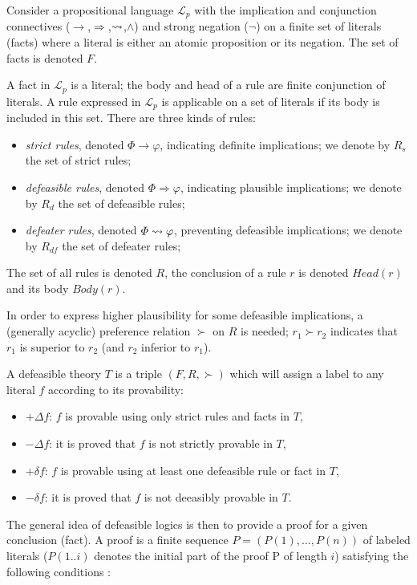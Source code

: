 \documentclass[version=3.21, pagesize, twoside=off, bibliography=totoc, DIV=calc, fontsize=12pt, a4paper, french, english]{scrartcl}
\begin{document}
Consider a propositional language $\mathcal{L}_p$ with the implication and conjunction connectives ($\rightarrow$,$\Rightarrow$,$\mathrel{\leadsto}$,$\land$) and strong negation ($\lnot$) on a finite set of literals (facts) where a literal is either an atomic proposition or its negation. 
The set of facts is denoted $F$.

A fact in $\mathcal{L}_p$ is a literal; the body and head of a rule are finite conjunction of literals. A rule expressed in $\mathcal{L}_p$ is applicable on a set of literals if its body is included in this set.
There are three kinds of rules:
\begin{itemize}
\item \emph{strict rules}, denoted $\Phi \rightarrow \varphi$, indicating definite implications; we denote by $R_s$ the set of strict rules;
\item \emph{defeasible rules}, denoted $\Phi \Rightarrow \varphi$, indicating plausible implications; we denote by $R_d$ the set of defeasible rules;
\item \emph{defeater rules}, denoted $\Phi \mathrel{\leadsto} \varphi$, preventing defeasible implications; we denote by $R_{df}$ the set of defeater rules;
\end{itemize}
The set of all rules is denoted $R$, the conclusion of a rule $r$ is denoted $Head(r)$ and its body $Body(r)$.

In order to express higher plausibility for some defeasible implications, a (generally acyclic) preference relation $\succ$ on $R$ is needed; $r_1 \succ r_2$ indicates that $r_1$ is superior to $r_2$ (and $r_2$ inferior to $r_1$).

A defeasible theory $T$ is a triple $(F,R,\succ)$ which will assign a label to any literal $f$ according to its provability:
\begin{itemize}
\item $+\Delta f$: $f$ is provable using only strict rules and facts in $T$,
\item $-\Delta f$: it is proved that $f$ is not strictly provable in $T$,
\item $+\delta f$: $f$ is provable using at least one defeasible rule or fact in $T$,
\item $-\delta f$: it is proved that $f$ is not deeasibly provable in $T$.
\end{itemize}

The general idea of defeasible logics is then to provide a proof for a given conclusion (fact). A proof is a finite sequence $P = (P(1), \dots, P(n))$ of labeled literals ($P(1..i)$ denotes the initial part of the proof P of length $i$) satisfying the following conditions \cite{Billington1993}:
\end{document}
